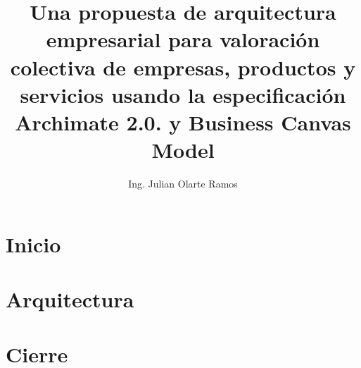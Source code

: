 \documentclass[
  twoside,
  11pt, letterpaper,
  footinclude=true,
  headinclude=true,
  cleardoublepage=empty
]{book}
\title{Una propuesta de arquitectura empresarial para valoración colectiva de empresas, productos y servicios usando la especificación Archimate 2.0. y Business Canvas Model}
\author{Ing. Julian Olarte Ramos}
\begin{document}
\maketitle

\graphicspath{{images/}}






\part{Inicio}




\part{Arquitectura}







\part{Cierre}




%
%
%



\end{document}
